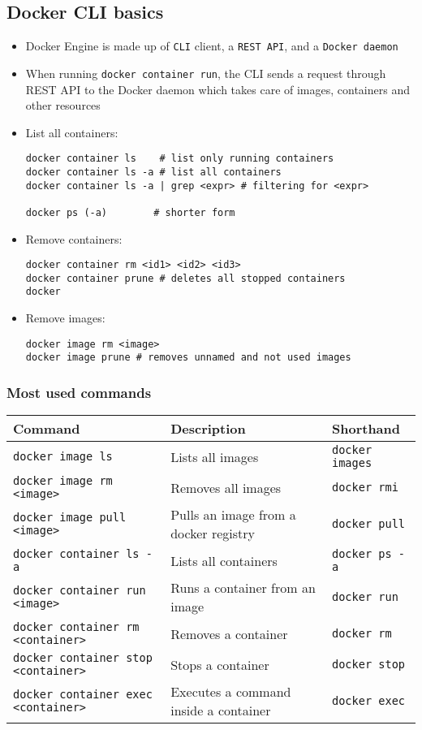 \documentclass[11pt]{scrartcl}
\begin{document}
\subsection{Docker CLI basics} \label{cli_basics}
\begin{itemize}
	\item Docker Engine is made up of \texttt{CLI} client, a \texttt{REST API}, and a \texttt{Docker daemon}
	\item When running \texttt{docker container run}, the CLI sends a request through REST API to the Docker daemon which takes care of images, containers and other resources
	\item List all containers:\begin{lstlisting}	
docker container ls    # list only running containers
docker container ls -a # list all containers
docker container ls -a | grep <expr> # filtering for <expr>
		
docker ps (-a) 		  # shorter form
	\end{lstlisting}
	\item Remove containers:
	\begin{lstlisting}
docker container rm <id1> <id2> <id3>
docker container prune # deletes all stopped containers
docker 
	\end{lstlisting}
	\item Remove images:
	\begin{lstlisting}
docker image rm <image>
docker image prune # removes unnamed and not used images
	\end{lstlisting}
\end{itemize}

\subsubsection{Most used commands} \label{commands}
\begin{tabular}{|l|l|l|}
	\hline
	\textbf{Command}							&	\textbf{Description}					&	\textbf{Shorthand}		\\
	\hline
	\texttt{docker image ls} 					&	Lists all images						&	\texttt{docker images}	\\
	\hline
	\texttt{docker image rm <image>}			&	Removes all images						&	\texttt{docker rmi}		\\
	\hline
	\texttt{docker image pull <image>}			&	Pulls an image from a docker registry	&	\texttt{docker pull}	\\
	\hline
	\texttt{docker container ls -a}				&	Lists all containers					& 	\texttt{docker ps -a}	\\
	\hline
	\texttt{docker container run <image>}		&	Runs a container from an image			&	\texttt{docker run}		\\
	\hline
	\texttt{docker container rm <container>}	&	Removes a container						&	\texttt{docker rm}		\\
	\hline
	\texttt{docker container stop <container>}	&	Stops a container						&	\texttt{docker stop}	\\
	\hline
	\texttt{docker container exec <container>}	&	Executes a command inside a container	& 	\texttt{docker exec}	\\
	\hline
\end{tabular}
\end{document}
